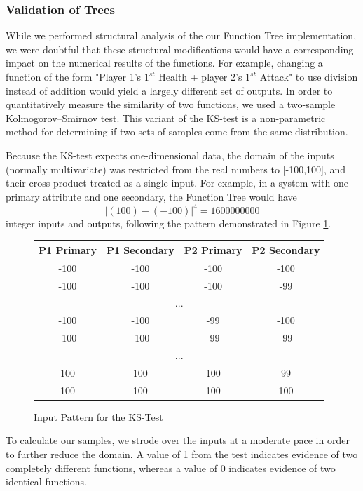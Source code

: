 \documentclass{acm_proc_article-sp}
\begin{document}
    \subsubsection{Validation of Trees}
    
While we performed structural analysis of the our Function Tree implementation, we were doubtful that these structural modifications would have a corresponding impact on the numerical results of the functions. For example, changing a function of the form "Player 1's $1^{st}$ Health + player 2's $1^{st}$ Attack" to use division instead of addition would yield a largely different set of outputs. In order to quantitatively measure the similarity of two functions, we used a two-sample Kolmogorov–Smirnov test. This variant of the KS-test is a non-parametric method for determining if two sets of samples come from the same distribution. 

Because the KS-test expects one-dimensional data, the domain of the inputs (normally multivariate) was restricted from the real numbers to [-100,100], and their cross-product treated as a single input. For example, in a system with one primary attribute and one secondary, the Function Tree would have $$|(100) - (-100)|^4 = 1600000000$$ integer inputs and outputs, following the pattern demonstrated in Figure \ref{ks-test-inputs}.

    \begin{figure}[h]
        \centering
\begin{tabular}{ | c | c | c | c | }
    \hline
    P1 Primary & P1 Secondary & P2 Primary & P2 Secondary  \\ \hline
    -100 & -100 & -100 & -100 \\ \hline
    -100 & -100 & -100 & -99 \\ \hline
    \multicolumn{4}{|c|}{...} \\ \hline
    -100 & -100 & -99 & -100 \\ \hline
    -100 & -100 & -99 & -99 \\ \hline
    \multicolumn{4}{|c|}{...} \\ \hline
    100 & 100 & 100 & 99 \\ \hline
    100 & 100 & 100 & 100 \\ \hline
    \hline
\end{tabular}
        \caption{Input Pattern for the KS-Test}
        \label{ks-test-inputs}
    \end{figure}

To calculate our samples, we strode over the inputs at a moderate pace in order to further reduce the domain. A value of 1 from the test indicates evidence of two completely different functions, whereas a value of 0 indicates evidence of two identical functions.
\end{document}
